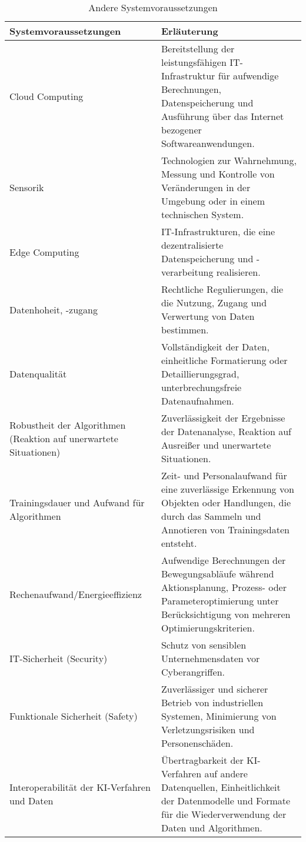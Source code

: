 \captionsetup{justification=centering, font=small, labelfont=bf, labelsep=colon}


\begin{longtable}{|>{\raggedright\arraybackslash}p{4.5cm}|>{\raggedright\arraybackslash}p{10cm}|}
    \caption{Andere Systemvoraussetzungen} \\
    \hline
    \rowcolor{lightgray}
    \textbf{Systemvoraussetzungen} & \textbf{Erläuterung} \\
    \hline
    Cloud Computing & Bereitstellung der leistungsfähigen IT-Infrastruktur für aufwendige Berechnungen, Datenspeicherung und Ausführung über das Internet bezogener Softwareanwendungen. \\
    \hline
    \rowcolor{darkgray}
    Sensorik & Technologien zur Wahrnehmung, Messung und Kontrolle von Veränderungen in der Umgebung oder in einem technischen System. \\
    \hline
    Edge Computing & IT-Infrastrukturen, die eine dezentralisierte Datenspeicherung und -verarbeitung realisieren. \\
    \hline
    \rowcolor{darkgray}
    Datenhoheit, -zugang & Rechtliche Regulierungen, die die Nutzung, Zugang und Verwertung von Daten bestimmen. \\
    \hline
    Datenqualität & Vollständigkeit der Daten, einheitliche Formatierung oder Detaillierungsgrad, unterbrechungsfreie Datenaufnahmen. \\
    \hline
    \rowcolor{darkgray}
    Robustheit der Algorithmen (Reaktion auf unerwartete Situationen) & Zuverlässigkeit der Ergebnisse der Datenanalyse, Reaktion auf Ausreißer und unerwartete Situationen. \\
    \hline
    Trainingsdauer und Aufwand für Algorithmen & Zeit- und Personalaufwand für eine zuverlässige Erkennung von Objekten oder Handlungen, die durch das Sammeln und Annotieren von Trainingsdaten entsteht. \\
    \hline
    \rowcolor{darkgray}
    Rechenaufwand/Energieeffizienz & Aufwendige Berechnungen der Bewegungsabläufe während Aktionsplanung, Prozess- oder Parameteroptimierung unter Berücksichtigung von mehreren Optimierungskriterien. \\
    \hline
    IT-Sicherheit (Security) & Schutz von sensiblen Unternehmensdaten vor Cyberangriffen. \\
    \hline
    \rowcolor{darkgray}
    Funktionale Sicherheit (Safety) & Zuverlässiger und sicherer Betrieb von industriellen Systemen, Minimierung von Verletzungsrisiken und Personenschäden. \\
    \hline
    Interoperabilität der KI-Verfahren und Daten & Übertragbarkeit der KI-Verfahren auf andere Datenquellen, Einheitlichkeit der Datenmodelle und Formate für die Wiederverwendung der Daten und Algorithmen. \\
    \hline
\end{longtable}

